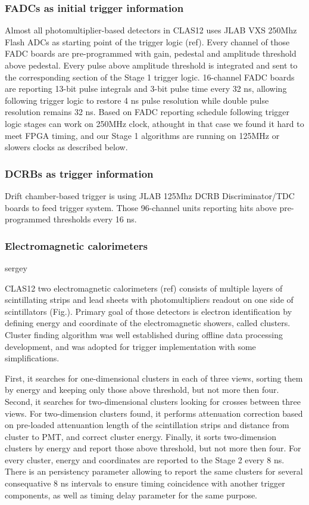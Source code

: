\subsubsection{FADCs as initial trigger information}

Almost all photomultiplier-based detectors in CLAS12 uses JLAB VXS 250Mhz Flash ADCs as starting point of the trigger logic (ref). Every channel of those FADC boards are pre-programmed with gain, pedestal and amplitude threshold above pedestal. Every pulse above amplitude threshold is integrated and sent to the corresponding section of the Stage 1 trigger logic. 16-channel FADC boards are reporting 13-bit pulse integrals and 3-bit pulse time every 32 ns, allowing following trigger logic to restore 4 ns pulse resolution while double pulse resolution remains 32 ns. Based on FADC reporting schedule following trigger logic stages can work on 250MHz clock, athought in that case we found it hard to meet FPGA timing, and our Stage 1 algorithms are running on 125MHz or slowers clocks as described below.

\subsubsection{DCRBs as trigger information}

Drift chamber-based trigger is using JLAB 125Mhz DCRB Discriminator/TDC boards to feed trigger system. Those 96-channel units reporting hits above pre-programmed thresholds every 16 ns.

\subsubsection{Electromagnetic calorimeters} sergey

CLAS12 two electromagnetic calorimeters (ref) consists of multiple layers of scintillating strips and lead sheets with photomultipliers readout on one side of scintillators (Fig.). Primary goal of those detectors is electron identification by defining energy and coordinate of the electromagnetic showers, called clusters. Cluster finding algorithm was well established during offline data processing development, and was adopted for trigger implementation with some simplifications.

First, it searches for one-dimensional clusters in each of three views, sorting them by energy and keeping only those above threshold, but not more then four. Second, it searches for two-dimensional clusters looking for crosses between three views. For two-dimension clusters found, it performs attenuation correction based on pre-loaded attenuantion length of the scintillation strips and distance from cluster to PMT, and correct cluster energy. Finally, it sorts two-dimension clusters by energy and report those above threshold, but not more then four. For every cluster, energy and coordinates are reported to the Stage 2 every 8 ns. There is an persistency parameter allowing to report the same clusters for several consequative 8 ns intervals to ensure timing coincidence with another trigger components, as well as timing delay parameter for the same purpose.

